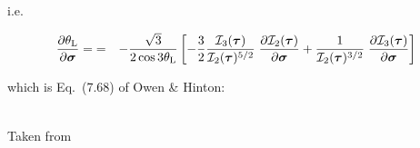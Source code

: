 i.e.
\begin{mdframed}[backgroundcolor=blue!5]
\begin{eqnarray}
\frac{\partial \theta_{\rm L}}{\partial \bm\sigma}
=
&=&
-\frac{\sqrt{3}}{2\cos 3\theta_{\rm L}}
\left[
-\frac32  \frac{ {\cal I}_3(\bm\tau)   }{ {\cal I}_2(\bm\tau)^{5/2}}
\; \frac{\partial {\cal I}_2(\bm\tau)}{\partial \bm\sigma} 
+  \frac{1}{{\cal I}_2(\bm\tau)^{3/2}} 
\; \frac{\partial  {\cal I}_3(\bm\tau)}{\partial \bm\sigma} 
\right]
\end{eqnarray}
\end{mdframed}
which is Eq.~(7.68) of Owen \& Hinton:
\begin{center}
\\
{\captionfont Taken from \textcite{owhi}}
\end{center}


